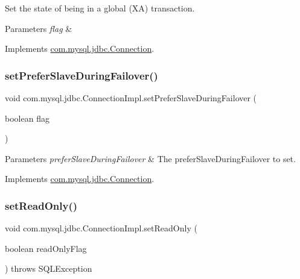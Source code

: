 Set the state of being in a global (XA) transaction.


\begin{DoxyParams}{Parameters}
{\em flag} & \\
\hline
\end{DoxyParams}


Implements \mbox{\hyperlink{interfacecom_1_1mysql_1_1jdbc_1_1_connection_ae5192425468c89f3d404ed0dece17cfc}{com.\+mysql.\+jdbc.\+Connection}}.

\mbox{\label{classcom_1_1mysql_1_1jdbc_1_1_connection_impl_a419ce8a33f7efdabf8fd3a38b81e94a7}} 
\subsubsection{\texorpdfstring{set\+Prefer\+Slave\+During\+Failover()}{setPreferSlaveDuringFailover()}}
{\footnotesize\ttfamily void com.\+mysql.\+jdbc.\+Connection\+Impl.\+set\+Prefer\+Slave\+During\+Failover (\begin{DoxyParamCaption}\item[{boolean}]{flag }\end{DoxyParamCaption})}


\begin{DoxyParams}{Parameters}
{\em prefer\+Slave\+During\+Failover} & The prefer\+Slave\+During\+Failover to set. \\
\hline
\end{DoxyParams}


Implements \mbox{\hyperlink{interfacecom_1_1mysql_1_1jdbc_1_1_connection_af8c0ed78ccafd6088266b19481b85ce6}{com.\+mysql.\+jdbc.\+Connection}}.

\mbox{\label{classcom_1_1mysql_1_1jdbc_1_1_connection_impl_a9a4ecd97e6b235da639bf42c6daf9a8d}} 
\subsubsection{\texorpdfstring{set\+Read\+Only()}{setReadOnly()}}
{\footnotesize\ttfamily void com.\+mysql.\+jdbc.\+Connection\+Impl.\+set\+Read\+Only (\begin{DoxyParamCaption}\item[{boolean}]{read\+Only\+Flag }\end{DoxyParamCaption}) throws S\+Q\+L\+Exception}

